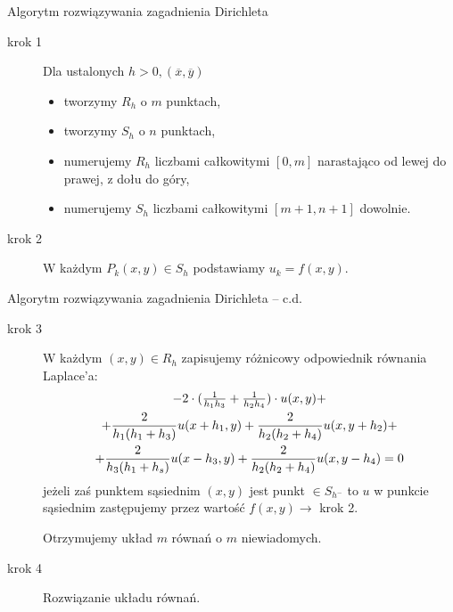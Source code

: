 \begin{frame}
  \begin{block}{Algorytm rozwiązywania zagadnienia Dirichleta}
    \begin{description}
      \item[krok 1]
        Dla ustalonych $h>0, (\overline{x},\overline{y})$
        \begin{itemize}
          \item tworzymy $R_h$ o $m$ punktach,
          \item tworzymy $S_h$ o $n$ punktach,
          \item numerujemy $R_h$ liczbami całkowitymi $[0,m]$ narastająco od lewej do prawej, z dołu do góry,
          \item numerujemy $S_h$ liczbami całkowitymi $[m+1, n+1]$ dowolnie.
        \end{itemize}
      \item[krok 2]
        W każdym $P_k(x,y) \in S_h$ podstawiamy $u_k = f(x,y)$.
    \end{description}
  \end{block}
\end{frame}

\begin{frame}
  \begin{block}{Algorytm rozwiązywania zagadnienia Dirichleta -- c.d.}
    \begin{description}
      \item[krok 3]
        W każdym $(x,y) \in R_h$ zapisujemy różnicowy odpowiednik równania Laplace'a:
        \begin{multline*}
          $$-2 \cdot ( \frac{1}{h_1 h_3} + \frac{1}{h_2 h_4}) \cdot u(x,y) + \\
          + \frac{2}{h_1 (h_1 + h_3)} u(x+h_1,y) + \frac{2}{h_2 (h_2 + h_4)} u(x,y + h_2) + \\
          + \frac{2}{h_3 (h_1 + h_s)} u(x-h_3,y) + \frac{2}{h_2 (h_2 + h_4)} u(x,y - h_4) = 0$$ %
        \end{multline*}
        jeżeli zaś punktem sąsiednim $(x,y)$ jest punkt $\in S_{h^-}$ %
        to $u$ w punkcie sąsiednim zastępujemy przez wartość $f(x,y) \rightarrow$ krok 2.

        Otrzymujemy układ $m$ równań o $m$ niewiadomych.
      \item[krok 4]
        Rozwiązanie układu równań.
    \end{description}
  \end{block}
\end{frame}

